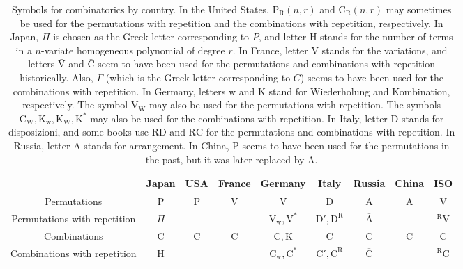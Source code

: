 \documentclass[amsmath,amssymb,prc,aps]{revtex4-2}
\begin{document}
\begin{table}[htb]
  \centering
  \begin{tabular}{c|cccccccc}
  \hline
                               & Japan        & USA          & France       & Germany             & Italy                       & Russia                  & China        & ISO \\ \hline\hline
  Permutations                 & $\mathrm{P}$ & $\mathrm{P}$ & $\mathrm{V}$ & $\mathrm{V}$        & $\mathrm{D}$                & $\mathrm{A}$            & $\mathrm{A}$ & $\mathrm{V}$   \\
  Permutations with repetition & $\Pi$        &              &              & $\mathrm{V_w, V^*}$ & $\mathrm{D}', \mathrm{D^R}$ & $\overline{\mathrm{A}}$ &              & $\mathrm{^RV}$ \\
  Combinations                 & $\mathrm{C}$ & $\mathrm{C}$ & $\mathrm{C}$ & $\mathrm{C, K}$     & $\mathrm{C}$                & $\mathrm{C}$            & $\mathrm{C}$ & $\mathrm{C}$   \\
  Combinations with repetition & $\mathrm{H}$ &              &              & $\mathrm{C_w, C^*}$ & $\mathrm{C}', \mathrm{C^R}$ & $\overline{\mathrm{C}}$ &              & $\mathrm{^RC}$ \\
  \hline
  \end{tabular}
  \caption{Symbols for combinatorics by country. In the United States,
  $\mathrm{P_R}(n,r)$ and $\mathrm{C_R}(n,r)$ may sometimes be used for the
  permutations with repetition and the combinations with repetition,
  respectively.  In Japan, $\Pi$ is chosen as the Greek letter corresponding to
  $P$, and letter $\mathrm{H}$ stands for the number of terms in a $n$-variate
  homogeneous polynomial of degree $r$.  In France, letter $\mathrm{V}$ stands
  for the variations, and letters $\bar{\mathrm{V}}$ and $\bar{\mathrm{C}}$
  seem to have been used for the permutations and combinations with repetition
  historically.  Also, $\Gamma$ (which is the Greek letter corresponding to
  $C$) seems to have been used for the combinations with repetition.  In
  Germany, letters $\mathrm{w}$ and $\mathrm{K}$ stand for Wiederholung and
  Kombination, respectively.  The symbol $\mathrm{V_W}$ may also be used for
  the permutations with repetition.  The symbols $\mathrm{C_W, K_w, K_W, K^*}$
  may also be used for the combinations with repetition.  In Italy, letter
  $\mathrm{D}$ stands for disposizioni, and some books use $\mathrm{RD}$ and
  $\mathrm{RC}$ for the permutations and combinations with repetition. In
  Russia, letter $\mathrm{A}$ stands for arrangement.  In China, $\mathrm{P}$
  seems to have been used for the permutations in the past, but it was later
  replaced by $\mathrm{A}$.}
  \label{tab:combinatorics.symbol}
\end{table}
\end{document}
